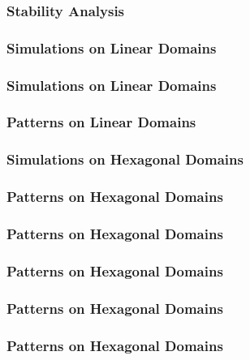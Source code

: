 \documentclass[aspectratio=169]{beamer}
\begin{document}
\begin{frame}
  \frametitle{Stability Analysis}
\end{frame}

\begin{frame}
  \frametitle{Simulations on Linear Domains}
\end{frame}

\begin{frame}
  \frametitle{Simulations on Linear Domains}
\end{frame}

\begin{frame}
  \frametitle{Patterns on Linear Domains}
\end{frame}

\begin{frame}
  \frametitle{Simulations on Hexagonal Domains}
\end{frame}

\begin{frame}
  \frametitle{Patterns on Hexagonal Domains}
\end{frame}

\begin{frame}
  \frametitle{Patterns on Hexagonal Domains}
\end{frame}

\begin{frame}
  \frametitle{Patterns on Hexagonal Domains}
\end{frame}

\begin{frame}
  \frametitle{Patterns on Hexagonal Domains}
\end{frame}

\begin{frame}
  \frametitle{Patterns on Hexagonal Domains}
\end{frame}
\end{document}
